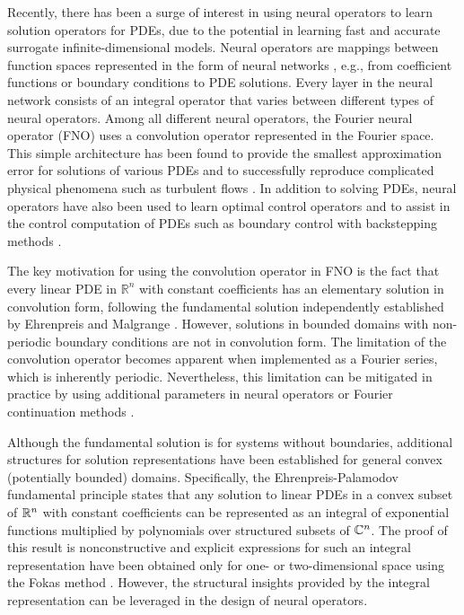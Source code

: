 \documentclass[letterpaper, 10 pt, conference]{ieeeconf}  %
\begin{document}
Recently, there has been a surge of interest in using neural operators to learn solution operators for PDEs, due to the potential in learning fast and accurate surrogate infinite-dimensional models.
Neural operators are mappings between function spaces represented in the form of neural networks \cite{kovachki2023neural}, e.g., from coefficient functions or boundary conditions to PDE solutions.
Every layer in the neural network consists of an integral operator that varies between different types of neural operators.
Among all different neural operators, the Fourier neural operator (FNO) \cite{li2020fourier} uses a convolution operator represented in the Fourier space. 
This simple architecture has been found to provide the smallest approximation error for solutions of various PDEs \cite{takamoto2022pdebench} and to successfully reproduce complicated physical phenomena such as turbulent flows \cite{li2020fourier}.
In addition to solving PDEs, neural operators have also been used to learn optimal control operators \cite{song2026learning} and to assist in the control computation of PDEs such as boundary control with backstepping methods \cite{bhan2023neural}.

The key motivation for using the convolution operator in FNO is the fact that every linear PDE in $\mathbb{R}^n$ with constant coefficients has an elementary solution in convolution form, following the fundamental solution independently established by Ehrenpreis \cite{ehrenpreis1954solution} and Malgrange \cite{malgrange1956existence}.
However, solutions in bounded domains with non-periodic boundary conditions are not in convolution form.
The limitation of the convolution operator becomes apparent when implemented as a Fourier series, which is inherently periodic.
Nevertheless, this limitation can be mitigated in practice by using additional parameters in neural operators \cite{li2020fourier} or Fourier continuation methods \cite{ganeshram2022fc}.

Although the fundamental solution is for systems without boundaries, additional structures for solution representations have been established for general convex (potentially bounded) domains.
Specifically, the Ehrenpreis-Palamodov fundamental principle \cite{ehrenpreis1970fourier,palamodov1970linear} states that any solution to linear PDEs in a convex subset of $\mathbb{R}^n$ with constant coefficients can be represented as an integral of exponential functions multiplied by polynomials over structured subsets of $\mathbb{C}^n$.
The proof of this result is nonconstructive and explicit expressions for such an integral representation have been obtained only for one- or two-dimensional space using the Fokas method \cite{fokas1997unified,fokas2008unified,deconinck2014method}.
However, the structural insights provided by the integral representation can be leveraged in the design of neural operators.
\end{document}
